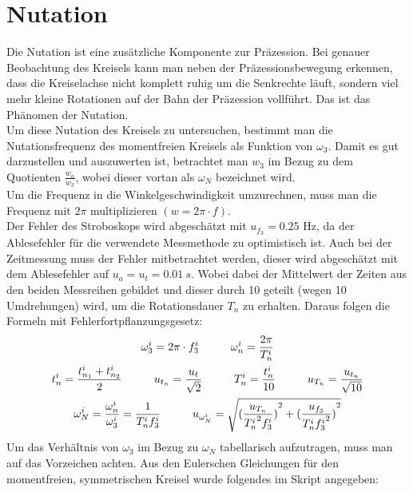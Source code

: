 

\section{Nutation}

Die Nutation ist eine zusätzliche Komponente zur Präzession. Bei genauer Beobachtung des Kreisels kann man neben der Präzessionsbewegung erkennen, dass die Kreiselachse nicht komplett ruhig um die Senkrechte läuft, sondern viel mehr kleine Rotationen auf der Bahn der Präzession vollführt. Das ist das Phänomen der Nutation.\\
Um diese Nutation des Kreisels zu untersuchen, bestimmt man die Nutationsfrequenz des momentfreien Kreisels als Funktion von $\omega_3$. Damit es gut darzustellen und auszuwerten ist, betrachtet man $w_3$ im Bezug zu dem Quotienten $\frac{w_n}{w_3}$, wobei dieser vortan als $\omega_N$ bezeichnet wird. \\
Um die Frequenz in die Winkelgeschwindigkeit umzurechnen, muss man die Frequenz mit $2\pi$ multiplizieren $(w =2\pi\cdot f)$.\\
Der Fehler des Stroboskops wird abgeschätzt mit $u_{f_3}=0.25$ Hz, da der Ablesefehler für die verwendete Messmethode zu optimistisch ist. 
Auch bei der Zeitmessung muss der Fehler mitbetrachtet werden, dieser wird abgeschätzt mit dem Ablesefehler auf $u_a=u_t=0.01~s$. Wobei dabei der Mittelwert der Zeiten aus den beiden Messreihen gebildet und dieser durch 10 geteilt (wegen 10 Umdrehungen) wird, um die Rotationsdauer $T_n$ zu erhalten. Daraus folgen die Formeln mit Fehlerfortpflanzungsgesetz:
\begin{gather}
    \omega_3^i=2\pi\cdot f_3^i  \tab \omega_n^i = \frac{2\pi}{T_n^i}\\
    t_n^i = \frac{t_{n_1}^i+t_{n_2}^i}{2}\tab u_{t_n} = \frac{u_t}{\sqrt{2}} \tab T_n^i=\frac{t_n^i}{10} \tab u_{T_n} = \frac{u_{t_n}}{\sqrt{10}}\\[0.3mm]
    \omega_N^i=\frac{\omega_n^i}{\omega_3^i} = \frac{1}{T_n^i f_3^i} 
    \tab u_{\omega_N^i} = \sqrt{{(\frac{u_{T_n}}{{T_n^i}^2f_3^i})}^2+{(\frac{u_{f_3}}{T_n^i{f_3^i}^2})}^2} 
\end{gather}
Um das Verhältnis von $\omega_3$ im Bezug zu $\omega_N$ tabellarisch aufzutragen, muss man auf das Vorzeichen achten. Aus den Eulerschen Gleichungen für den momentfreien, symmetrischen Kreisel wurde folgendes im Skript angegeben:
